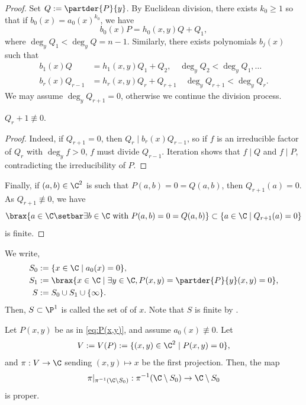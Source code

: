 \documentclass[11pt]{report}
\begin{document}
\begin{proof}
    Set $Q:=\partder{P}{y}$. By Euclidean division, there exists $k_0 \geq 1$ so that if $b_0(x)=a_0(x)^{k_0}$, we have
    $$b_0(x)P=h_0(x,y)Q+Q_1,$$
    where $\deg_yQ_1 < \deg _yQ = n-1$. Similarly, there exists polynomials $b_j(x)$ such that
    \begin{align*}
        b_1(x)Q &= h_1(x,y)Q_1 + Q_2, \quad \deg_yQ_2 < \deg_yQ_1,\dots
        \\ b_r(x)Q_{r-1} &=h_r(x,y) Q_r + Q_{r+1} \quad \deg_y Q_{r+1}< \deg _yQ_r.
    \end{align*}
    We may assume $\deg_y Q_{r+1}=0$, otherwise we continue the division process.
    \begin{claim}
        $Q_r+1 \not \equiv 0$.
    \end{claim}
    \begin{proof}
        Indeed, if $Q_{r+1}=0$, then $Q_r \mid b_r(x)Q_{r-1}$, so if $f$ is an irreducible factor of $Q_r$ with $\deg_yf>0$, $f$ must divide $Q_{r-1}$. Iteration shows that $f\mid Q$ and $f \mid P$, contradicting the irreducibility of $P$.
    \end{proof}
    Finally, if $(a,b) \in \C^2$ is such that $P(a,b)=0=Q(a,b)$, then $Q_{r+1}(a)=0$. As $Q_{r+1} \not \equiv 0$, we have
    $$\brax{a \in \C \setbar \exists b \in \C \text{ with } P(a,b)=0=Q(a,b)}\subset \{a\in \C \mid Q_{r+1}(a)=0\}$$
    is finite.
\end{proof}

\begin{defn}
    We write,
    \begin{align*}
        S_0 &:=\{ x \in \C \mid a_0(x)=0\},
        \\ S_1 &:= \brax{x \in \C \mid \exists y \in \C, P(x,y)=\partder{P}{y}(x,y)=0},
        \\ S &:= S_0\cup S_1 \cup \{\infty\}.
    \end{align*}
    Then, $S \subset \P^1$ is called the set of  of $x$. Note that $S$ is finite by .
\end{defn}

\begin{prop}[][label=prop:projproper]
    Let $P(x,y)$ be as in \eqref{eq:P(x,y)}, and assume $a_0(x) \not \equiv 0$. Let
    $$V := V(P):= \{(x,y) \in \C^2 \mid P(x,y)=0\},$$
    and $\pi:V \to \C$ sending $(x,y) \mapsto x$ be the first projection. Then, the map
    $$\pi|_{\pi^{-1}(\C\setminus S_0)}:\pi^{-1}(\C\setminus S_0) \to \C\setminus S_0$$
    is proper.
\end{prop}
\end{document}

